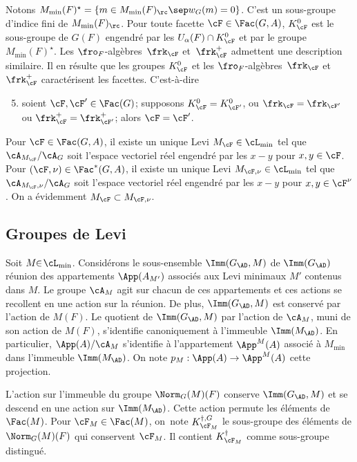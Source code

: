 Notons $M_{\min}(F)^{\star}=\{m\in M_{\min}(F)_{\rc}\sep w_{G}(m)=0\}$. C'est un sous-groupe d'indice fini de $M_{\min}(F)_{\rc}$. Pour toute facette $\cF\in \Fac(G,A)$, $K_{\cF}^0$ est le sous-groupe de $G(F)$ engendré par les $U_{\alpha}(F)\cap K_{\cF}^0$ et par le groupe $M_{\min}(F)^{\star}$. Les $\fro_{F}$-algèbres~$\frk_{\cF}$ et~$\frk_{\cF}^+$ admettent une description similaire. Il en résulte que
les groupes $K_{\cF}^0$ et les $\fro_{F}$-algèbres~$\frk_{\cF}$ et~$\frk_{\cF}^+$ caractérisent les facettes. C'est-à-dire
\begin{enumerate}\setcounter{enumi}{4}
\item\label{description5}
soient $\cF,\cF'\in \Fac(G)$; supposons $K_{\cF}^0=K_{\cF'}^0$, ou $\frk_{\cF}=\frk_{\cF'}$ ou $\frk^+_{\cF}=\frk^+_{\cF'}$; alors $\cF=\cF'$.
\end{enumerate}

Pour $\cF\in \Fac(G,A)$, il existe un unique Levi $M_{\cF}\in \cL_{\min}$ tel que $\cA_{M_{\cF}}/\cA_{G}$ soit l'espace vectoriel réel engendré par les $x-y$ pour $x,y\in \cF$. Pour $(\cF,\nu)\in \Fac^*(G,A)$, il existe un unique Levi $M_{\cF,\nu}\in \cL_{\min}$ tel que $\cA_{M_{\cF},\nu}/\cA_{G}$ soit l'espace vectoriel réel engendré par les $x-y$ pour $x,y\in \cF^{\nu}$. On a évidemment $M_{\cF}\subset M_{\cF,\nu}$.

\subsection{Groupes de Levi}\label{groupesdelevi}
Soit $M\!\!\in\!\cL_{\min}$. Considérons le sous-ensemble $\Imm(G_{\AD},M)$ de $\Imm(G_{\AD})$ réunion des appartements $\App(A_{M'})$ associés aux Levi minimaux $M'$ contenus dans $M$. Le groupe $\cA_{M}$ agit sur chacun de ces appartements et ces actions se recollent en une action sur la réunion. De plus, $\Imm(G_{\AD},M)$ est conservé par l'action de $M(F)$. Le quotient de $\Imm(G_{\AD},M)$ par l'action de $\cA_{M}$, muni de son action de $M(F)$, s'identifie canoniquement à l'immeuble $\Imm(M_{\AD})$. En particulier, $\App(A)/\cA_{M}$ s'identifie à l'appartement $\App^M(A)$ associé à $M_{\min}$ dans l'immeuble $\Imm(M_{\AD})$. On note $p_{M}:\App(A)\to \App^M(A)$ cette projection.

L'action sur l'immeuble du groupe $\Norm_{G}(M)(F)$ conserve $\Imm(G_{\AD},M)$ et se descend en une action sur $\Imm(M_{\AD})$. Cette action permute les éléments de $\Fac(M)$. Pour $\cF_{M}\in \Fac(M)$, on~note $K_{\cF_{M}}^{\dag,G}$ le sous-groupe des éléments de $\Norm_{G}(M)(F)$ qui conservent $\cF_{M}$. Il contient $K_{\cF_{M}}^{\dag}$ comme sous-groupe distingué.

